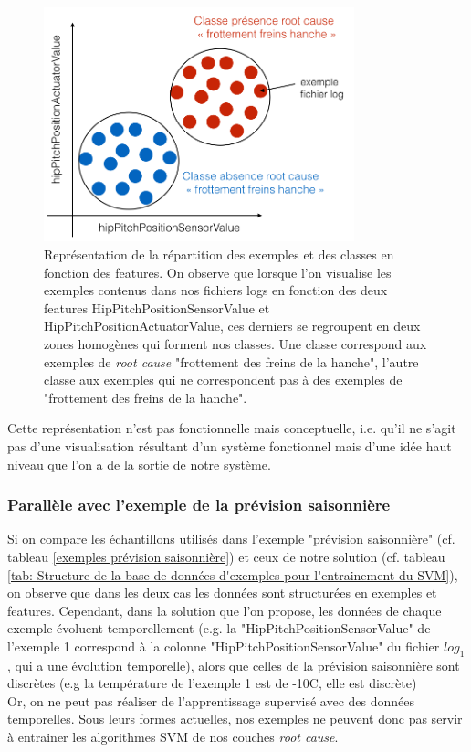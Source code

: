 \begin{figure}[h]
	\centering\includegraphics[width=9cm]{images/classes_log.png}
	\caption[Représentation de la répartition des exemples et des classes en fonction des features]{Représentation de la répartition des exemples et des classes en fonction des features. On observe que lorsque l'on visualise les exemples contenus dans nos fichiers logs en fonction des deux features HipPitchPositionSensorValue et HipPitchPositionActuatorValue, ces derniers se regroupent en deux zones homogènes qui forment nos classes. Une classe correspond aux exemples de \emph{root cause} "frottement des freins de la hanche", l'autre classe aux exemples qui ne correspondent pas à des exemples de "frottement des freins de la hanche".}
	\label{fig:Représentation de la répartition des exemples et des classes en fonction des features}
\end{figure}

Cette représentation n'est pas fonctionnelle mais conceptuelle, i.e. qu'il ne s'agit pas d'une visualisation résultant d'un système fonctionnel mais d'une idée haut niveau que l'on a de la sortie de notre système. 


\subsubsection{Parallèle avec l'exemple de la prévision saisonnière}
\label{Automatisation du processus d'investigation: Achitecture High Level du système proposé: Les exemples: Parallèle avec l'exemple de la prévision saisonnière}
Si on compare les échantillons utilisés dans l'exemple "prévision saisonnière" (cf. tableau \ref{exemples prévision saisonnière}) et ceux de notre solution (cf. tableau \ref {tab: Structure de la base de données d'exemples pour l'entrainement du SVM}), on observe que dans les deux cas les données sont structurées en exemples et features. Cependant, dans la solution que l'on propose, les données de chaque exemple évoluent temporellement (e.g. la "HipPitchPositionSensorValue" de l'exemple 1 correspond à la colonne "HipPitchPositionSensorValue" du fichier $log_1$, qui a une évolution temporelle), alors que celles de la prévision saisonnière sont discrètes (e.g la température de l'exemple 1 est de -10\degres C, elle est discrète) \\
Or, on ne peut pas réaliser de l'apprentissage supervisé avec des données temporelles. Sous leurs formes actuelles, nos exemples ne peuvent donc pas servir à entrainer les algorithmes SVM de nos couches \emph{root cause}.



